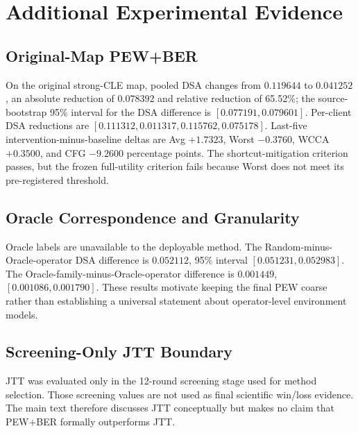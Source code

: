 \documentclass[10pt,twocolumn]{article}
\begin{document}
\section{Additional Experimental Evidence}

\subsection{Original-Map PEW+BER}

On the original strong-CLE map, pooled DSA changes from \(0.119644\) to \(0.041252\), an absolute reduction of \(0.078392\) and relative reduction of 65.52\%; the source-bootstrap 95\% interval for the DSA difference is \([0.077191,0.079601]\). Per-client DSA reductions are \([0.111312,0.011317,0.115762,0.075178]\). Last-five intervention-minus-baseline deltas are Avg \(+1.7323\), Worst \(-0.3760\), WCCA \(+0.3500\), and CFG \(-9.2600\) percentage points. The shortcut-mitigation criterion passes, but the frozen full-utility criterion fails because Worst does not meet its pre-registered threshold.

\subsection{Oracle Correspondence and Granularity}

\begin{table}[!ht]
\centering
\scriptsize
\caption{Oracle correspondence and granularity audit.}
\label{tab:oracle-granularity}
\end{table}

Oracle labels are unavailable to the deployable method. The Random-minus-Oracle-operator DSA difference is \(0.052112\), 95\% interval \([0.051231,0.052983]\). The Oracle-family-minus-Oracle-operator difference is \(0.001449\), \([0.001086,0.001790]\). These results motivate keeping the final PEW coarse rather than establishing a universal statement about operator-level environment models.

\subsection{Screening-Only JTT Boundary}

JTT was evaluated only in the 12-round screening stage used for method selection. Those screening values are not used as final scientific win/loss evidence. The main text therefore discusses JTT conceptually \citep{liu2021jtt} but makes no claim that PEW+BER formally outperforms JTT.



\end{document}
